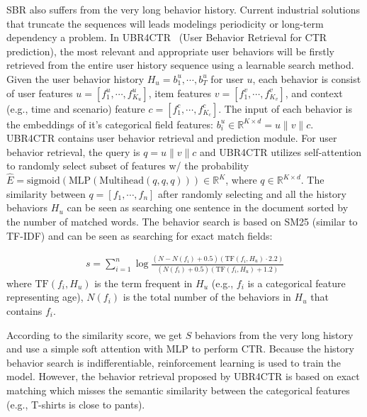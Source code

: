 SBR also suffers from the very long behavior history.
Current industrial solutions that truncate the sequences will leads modelings periodicity or long-term dependency a problem.
In UBR4CTR~ (User Behavior Retrieval for CTR prediction), the most relevant and appropriate user behaviors will be firstly retrieved from the entire user history sequence using a learnable search method.
Given the user behavior history $H_u = {b_1^u, \cdots, b_T^u}$ for user $u$, each behavior is consist of user features $u = [ f_1^u, \cdots, f_{K_u}^u ]$, item features $v = [f_1^v, \cdots, f_{K_v}^v]$, and context (e.g., time and scenario) feature $c = [f_1^c, \cdots, f_{K_c}^c]$.
The input of each behavior is the embeddings of it's categorical field features: $b_i^u \in \mathbb{R}^{K \times d} = u \parallel v \parallel c$.
UBR4CTR contains user behavior retrieval and prediction module. 
For user behavior retrieval, the query is $q = u \parallel v \parallel c$ and UBR4CTR utilizes self-attention to randomly select subset of features w/ the probability $\hat{E} = \text{sigmoid}(\text{MLP}(\text{Multihead}(q, q, q))) \in \mathbb{R}^K$, where $q \in \mathbb{R}^{K \times d}$.
The similarity between $q = [f_1, \cdots, f_n]$ after randomly selecting and all the history behaviors $H_u$ can be seen as searching one sentence in the document sorted by the number of matched words.
The behavior search is based on SM25 (similar to TF-IDF) and can be seen as searching for exact match fields:

\begin{align}
	s = \sum_{i=1}^n \log \frac{(N - N(f_i) + 0.5) (\text{TF}(f_i, H_u) \cdot 2.2)}{(N(f_i) + 0.5) (\text{TF}(f_i, H_u) + 1.2)}
\end{align}
where $\text{TF}(f_i, H_u)$ is the term frequent in $H_u$ (e.g., $f_i$ is a categorical feature representing age), $N(f_i)$ is the total number of the behaviors in $H_u$ that contains $f_i$.

According to the similarity score, we get $S$ behaviors from the very long history and use a simple soft attention with MLP to perform CTR.
Because the history behavior search is indifferentiable, reinforcement learning  is used to train the model.
However, the behavior retrieval proposed by UBR4CTR is based on exact matching which misses the semantic similarity between the categorical features (e.g., T-shirts is close to pants).

